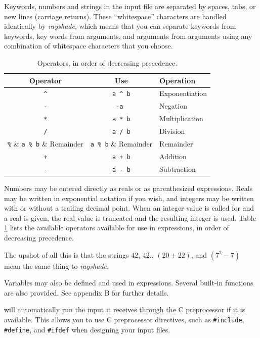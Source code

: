 Keywords, numbers and strings in the input file are separated by spaces,
tabs, or new lines (carriage returns).  These ``whitespace'' characters
are handled identically by {\em rayshade}, which means that you can separate
keywords from keywords, key words from arguments, and arguments from
arguments using any combination of whitespace characters that you choose.

\begin{table}
\centering
\begin{tabular}{|c|c|l|}\hline\hline
Operator &    Use    & Operation \\ \hline \hline
\verb+^+ &  \verb!a ^ b!  & Exponentiation \\  \hline
\verb+-+ &  \verb! -a  !  & Negation  \\   \hline
\verb+*+ &  \verb!a * b!  & Multiplication  \\  \hline
\verb+/+ &  \verb!a / b!  & Division     \\  \hline
\verb+%+ &  \verb!a % b!  & Remainder    \\  \hline
\verb-+- &  \verb!a + b!  & Addition     \\ \hline
\verb+-+ &  \verb!a - b!  & Subtraction  \\ \hline \hline
\end{tabular}
\caption{Operators, in order of decreasing precedence.}
\label{tab:operators}
\end{table}

Numbers may be entered directly as reals or as parenthesized expressions.
Reals may be written in exponential notation if you wish, and
integers may be written with or without a trailing decimal point.
When an integer value is called for and a real is given,
the real value is truncated and the resulting integer is used.
Table \ref{tab:operators} lists the available operators
available for use in expressions, in order of decreasing precedence.

The upshot of all this is that the strings
{\tt $42$}, {\tt $42.$},
{\tt $(20 + 22)$}, and {\tt $(7^2 - 7)$} mean the same thing
to {\em rayshade}.

Variables may also be defined and used in expressions.  Several
built-in functions are also provided.  See appendix B for further details.

\Rayshade will automatically run the input it receives
through the C preprocessor if it is available.  This
allows you to use C preprocessor directives, such as {\tt \#include},
{\tt \#define}, and {\tt \#ifdef} when designing your input files.

